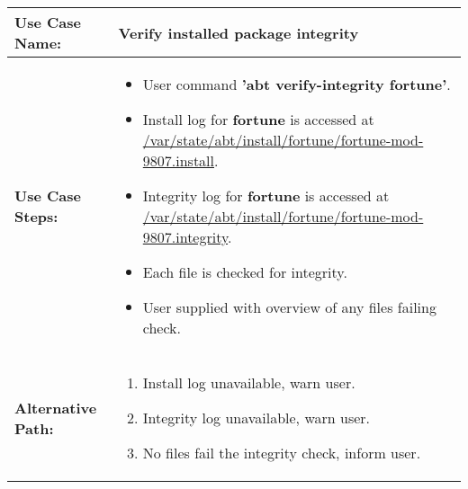 \medskip

\begin{tabularx}{\linewidth}{|l|X|}
\hline
\textbf{Use Case Name:} & \textbf{Verify installed package integrity} \\
\hline
\textbf{Use Case Steps:} & 
\begin{minipage}{\linewidth} 
  \vspace{0.05em}
  \begin{itemize}
    \item User command \textbf{'abt verify-integrity fortune'}.
    \item Install log for \textbf{fortune} is accessed at \url{/var/state/abt/install/fortune/fortune-mod-9807.install}.
    \item Integrity log for \textbf{fortune} is accessed at \url{/var/state/abt/install/fortune/fortune-mod-9807.integrity}.
    \item Each file is checked for integrity.
    \item User supplied with overview of any files failing check.
  \end{itemize}
  \vspace{0.05em}
\end{minipage}
\\
\hline 
\textbf{Alternative Path:} &
\begin{minipage}{\linewidth}
  \vspace{0.05em} 
  \begin{enumerate}
    \item Install log unavailable, warn user.
    \item Integrity log unavailable, warn user.
    \item No files fail the integrity check, inform user.
  \end{enumerate}
  \vspace{0.05em} 
\end{minipage}
\\
\hline
\end{tabularx}